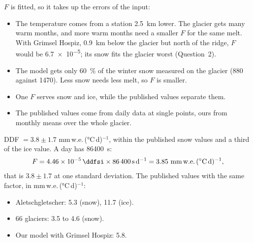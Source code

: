 \documentclass{scrartcl}
\begin{document}
\begin{reportpart}
{$F$ is fitted, so it takes up the errors of the input:
\begin{itemize}
  \item The temperature comes from a station \qty{2.5}{\kilo\metre} lower. The glacier gets
    many warm months, and more warm months need a smaller $F$ for the same melt. With Grimsel
    Hospiz, \qty{0.9}{\kilo\metre} below the glacier but north of the ridge, $F$ would be
    \qty{6.7e-5}{\ddfsi}; its snow fits the glacier worst (Question~2).
  \item The model gets only \qty{60}{\percent} of the winter snow measured on the glacier
    (\qty{880}{} against \qty{1470}{\areal}). Less snow needs less melt, so $F$ is smaller.
  \item One $F$ serves snow and ice, while the published values separate them.
  \item The published values come from daily data at single points, ours from monthly means
    over the whole glacier.
\end{itemize}

\begin{converted}
DDF $= 3.8 \pm 1.7$ mm\,w.e.\,(\unit{\degreeCelsius}\,d)$^{-1}$, within the published snow
values and a third of the ice value. A day has \qty{86400}{\second}:
\[
  F = \qty{4.46e-5}{\ddfsi} \times \qty{86400}{\second\per\day}
  = 3.85\ \text{mm\,w.e.}\,(\unit{\degreeCelsius}\,\text{d})^{-1} ,
\]
that is $3.8 \pm 1.7$ at one standard deviation.
The published values with the same factor, in mm\,w.e.\,(\unit{\degreeCelsius}\,d)$^{-1}$:
\begin{itemize}
  \item Aletschgletscher: 5.3 (snow), 11.7 (ice).
  \item 66 glaciers: 3.5 to 4.6 (snow).
  \item Our model with Grimsel Hospiz: 5.8.
\end{itemize}
\end{converted}}


\end{reportpart}
\end{document}

